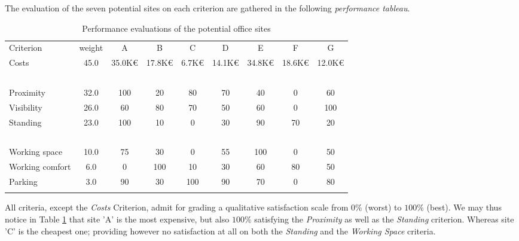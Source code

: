 The evaluation of the seven potential sites on each criterion are gathered in the following \emph{performance tableau}.
\begin{table}[h]
\caption{Performance evaluations of the potential office sites}
\label{tab:6.3}       %
\begin{center}
    \begin{tabular}{l|c|c|c|c|c|c|c|c}
      \svhline\noalign{\smallskip}
    Criterion  &   weight &  A  &      B &       C &       D &       E &        F &        G\\
       \noalign{\smallskip}\hline\noalign{\smallskip}

    Costs     &    45.0  &   35.0K€ &  17.8K€  & 6.7K€  &  14.1K€ &  34.8K€ &  18.6K€ &  12.0K€\\
    \      &        \    &   \      &  \     &   \     &   \    &    \    &    \    &    \ \\
    Proximity     &     32.0  &   100    &  20 &      80    &   70    &   40    &   0    &    60 \\
    Visibility     &     26.0  &   60     &  80  &     70    &   50    &   60    &   0    &    100 \\
    Standing     &     23.0  &   100   &   10   &    0     &   30    &   90    &   70   &    20 \\
    \        &      \    &   \     &   \    &    \     &   \     &   \     &   \    &    \  \\
    Working space     &     10.0  &   75    &   30   &    0     &   55    &   100   &   0    &    50  \\
    Working comfort     &      6.0  &   0     &   100  &    10    &   30    &   60    &   80   &    50 \\
    Parking     &      3.0  &   90    &   30   &    100   &   90    &   70    &   0    &    80 \\
      \noalign{\smallskip}\hline
    \end{tabular}
  \end{center}
\end{table}

All criteria, except the \emph{Costs} Criterion, admit for grading a qualitative satisfaction scale from $0\%$ (worst) to $100\%$ (best). We may thus notice in Table \ref{tab:6.3} that site 'A' is the most expensive, but also $100\%$ satisfying the \emph{Proximity} as well as the  \emph{Standing} criterion. Whereas site 'C' is the cheapest one; providing however no satisfaction at all on both the \emph{Standing} and the \emph{Working Space} criteria.

